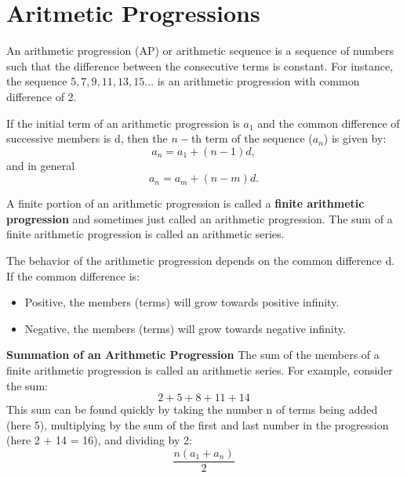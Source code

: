 \documentclass{beamer}
\begin{document}
\section{Aritmetic Progressions}

An arithmetic progression (AP) or arithmetic sequence is a sequence of numbers such that the difference between the consecutive terms is constant. For instance, the sequence $5, 7, 9, 11, 13, 15 \ldots$ is an arithmetic progression with common difference of 2.



If the initial term of an arithmetic progression is $a_{1}$ and the common difference of successive members is d, then the $n-$th term of the sequence ($a_{n}$) is given by:
\[ a_{n}=a_{1}+(n-1)d, \] 
and in general
\[ a_{n}=a_{m}+(n-m)d.\]



A finite portion of an arithmetic progression is called a \textbf{finite arithmetic progression} and sometimes just called an arithmetic progression. The sum of a finite arithmetic progression is called an arithmetic series.
\newline



The behavior of the arithmetic progression depends on the common difference d. If the common difference is:
\begin{itemize}
\item Positive, the members (terms) will grow towards positive infinity.
\item Negative, the members (terms) will grow towards negative infinity.
\end{itemize}



\textbf{Summation of an Arithmetic Progression}
The sum of the members of a finite arithmetic progression is called an arithmetic series. For example, consider the sum:
\[2+5+8+11+14\]
This sum can be found quickly by taking the number n of terms being added (here 5), multiplying by the sum of the first and last number in the progression (here 2 + 14 = 16), and dividing by 2:
\[{\frac  {n(a_{1}+a_{n})}{2}}\]
\end{document}
